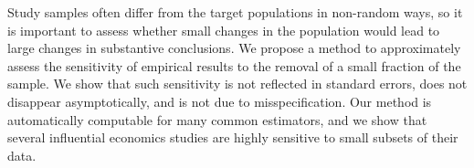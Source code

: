 
Study samples often differ from the target populations in non-random ways, so it
is important to assess whether small changes in the population would lead to
large changes in substantive conclusions. We propose a method to approximately
assess the sensitivity of empirical results to the removal of a small fraction
of the sample.  We show that such sensitivity is not reflected in standard
errors, does not disappear asymptotically, and is not due to misspecification.
Our method is automatically computable for many common estimators, and we show
that several influential economics studies are highly sensitive to small subsets
of their data.
